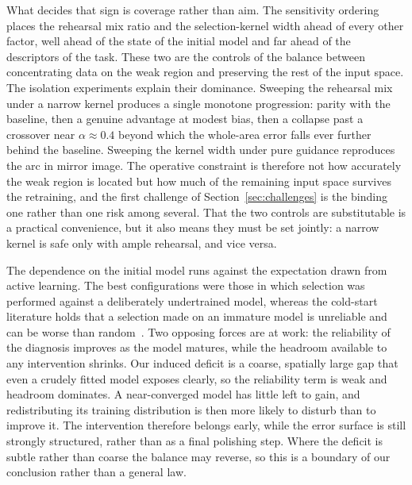 \documentclass[conference]{IEEEtran}
\begin{document}
What decides that sign is coverage rather than aim. The sensitivity ordering places the
rehearsal mix ratio and the selection-kernel width ahead of every other factor, well
ahead of the state of the initial model and far ahead of the descriptors of the task.
These two are the controls of the balance between concentrating data on the weak region
and preserving the rest of the input space. The isolation experiments explain their
dominance. Sweeping the rehearsal mix under a narrow kernel produces a single monotone
progression: parity with the baseline, then a genuine advantage at modest bias, then a
collapse past a crossover near $\alpha\approx0.4$ beyond which the whole-area error
falls ever further behind the baseline. Sweeping the kernel width under pure guidance
reproduces the arc in mirror image. The operative constraint is therefore not how
accurately the weak region is located but how much of the remaining input space survives
the retraining, and the first challenge of Section~\ref{sec:challenges} is the binding
one rather than one risk among several. That the two controls are substitutable is a
practical convenience, but it also means they must be set jointly: a narrow kernel is
safe only with ample rehearsal, and vice versa.

The dependence on the initial model runs against the expectation drawn from active
learning. The best configurations were those in which selection was performed against a
deliberately undertrained model, whereas the cold-start literature holds that a
selection made on an immature model is unreliable and can be worse than
random~\cite{chen2022coldstart}. Two opposing forces are at work: the reliability of the
diagnosis improves as the model matures, while the headroom available to any
intervention shrinks. Our induced deficit is a coarse, spatially large gap that even a
crudely fitted model exposes clearly, so the reliability term is weak and headroom
dominates. A near-converged model has little left to gain, and redistributing its
training distribution is then more likely to disturb than to improve it. The
intervention therefore belongs early, while the error surface is still strongly
structured, rather than as a final polishing step. Where the deficit is subtle rather
than coarse the balance may reverse, so this is a boundary of our conclusion rather than
a general law.
\end{document}
